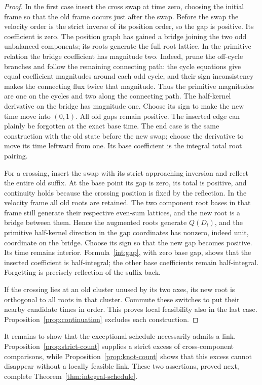 \begin{proof}
In the first case insert the cross swap at time zero, choosing the
initial frame so that the old frame occurs just after the swap.
Before the swap the velocity order is the strict inverse of its
position order, so the gap is positive.  Its coefficient is zero.
The position graph has gained a bridge joining the two odd unbalanced
components; its roots generate the full root lattice.  In the
primitive relation the bridge coefficient has magnitude two.  Indeed,
prune the off-cycle branches and follow the remaining connecting path:
the cycle equations give equal coefficient magnitudes around each odd
cycle, and their sign inconsistency makes the connecting flux twice
that magnitude.  Thus the primitive magnitudes are one on the cycles
and two along the connecting path.  The half-kernel derivative on the
bridge has magnitude one.  Choose its sign to
make the new time move into \((0,1)\).  All old gaps remain positive.
The inserted edge can plainly be forgotten at the exact base time.
The end case is the same construction with the old state before the
new swap; choose the derivative to move its time leftward from one.
Its base coefficient is the integral total root pairing.

For a crossing, insert the swap with its strict approaching inversion
and reflect the entire old suffix.  At the base point its gap is zero,
its total is positive, and continuity holds because the crossing
position is fixed by the reflection.  In the velocity frame all old
roots are retained.  The two component root bases in that frame still
generate their respective even-sum lattices, and the new root is a
bridge between them.  Hence the augmented roots generate \(Q(D_l)\),
and the primitive half-kernel direction in the gap coordinates has
nonzero, indeed unit, coordinate on the bridge.  Choose its sign so
that the new gap becomes positive.  Its time remains interior.
Formula~\eqref{int:gap}, with zero base gap, shows that the inserted
coefficient is half-integral; the other base coefficients remain
half-integral.  Forgetting is precisely reflection of the suffix back.

If the crossing lies at an old cluster unused by its two axes, its new
root is orthogonal to all roots in that cluster.  Commute these
switches to put their nearby candidate times in order.  This proves
local feasibility also in the last case.  Proposition~\ref{prop:continuation}
excludes each construction.
\end{proof}

It remains to show that the exceptional schedule necessarily admits a
link.  Proposition~\ref{prop:strict-count} supplies a strict excess of
cross-component comparisons, while Proposition~\ref{prop:knot-count}
shows that this excess cannot disappear without a locally feasible
link.  These two assertions, proved next, complete
Theorem~\ref{thm:integral-schedule}.
